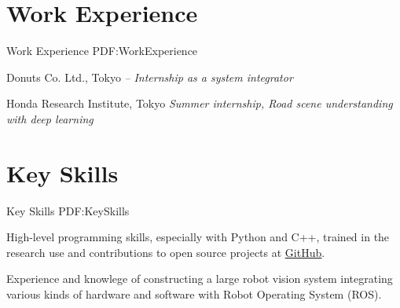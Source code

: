 \documentclass[letterpaper,MMMyyyy,nonstop]{simpleresumecv}
\begin{document}
\begin{body}

\section
{Work Experience}
{Work Experience}
{PDF:WorkExperience}

Donuts Co. Ltd., Tokyo
\hfill
\textit{ -- }
\newline
\textit{Internship as a system integrator}

\BigGapNoBreak

Honda Research Institute, Tokyo
\hfill
\textit{}
\newline
\textit{Summer internship, Road scene understanding with deep learning}

%
%
%
%


\section
{Key Skills}
{Key Skills}
{PDF:KeySkills}

\BulletItem
High-level programming skills, especially with Python and C++,
trained in the research use and contributions to open source projects at
\href{http://github.com/wkentaro}{\underline{GitHub}}.

\BulletItem
Experience and knowlege of constructing a large robot vision system integrating various kinds of hardware and software
with Robot Operating System (ROS).


\end{body}
\end{document}
